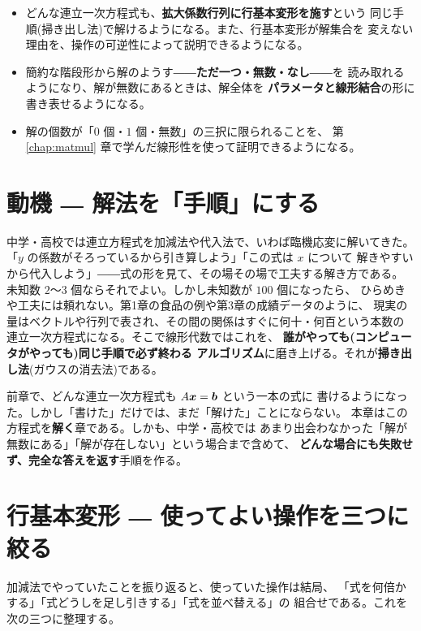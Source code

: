 \begin{goal}
\begin{itemize}
\item どんな連立一次方程式も、\textbf{拡大係数行列に行基本変形を施す}という
同じ手順(掃き出し法)で解けるようになる。また、行基本変形が解集合を
変えない理由を、操作の可逆性によって説明できるようになる。
\item 簡約な階段形から解のようす――\textbf{ただ一つ・無数・なし}――を
読み取れるようになり、解が無数にあるときは、解全体を
\textbf{パラメータと線形結合}の形に書き表せるようになる。
\item 解の個数が「$0$ 個・$1$ 個・無数」の三択に限られることを、
第 \ref{chap:matmul} 章で学んだ線形性を使って証明できるようになる。
\end{itemize}
\end{goal}

\section{動機 ― 解法を「手順」にする}

中学・高校では連立方程式を加減法や代入法で、いわば臨機応変に解いてきた。
「$y$ の係数がそろっているから引き算しよう」「この式は $x$ について
解きやすいから代入しよう」――式の形を見て、その場その場で工夫する解き方である。
未知数 $2$〜$3$ 個ならそれでよい。しかし未知数が $100$ 個になったら、
ひらめきや工夫には頼れない。第1章の食品の例や第3章の成績データのように、
現実の量はベクトルや行列で表され、その間の関係はすぐに何十・何百という本数の
連立一次方程式になる。そこで線形代数ではこれを、
\textbf{誰がやっても(コンピュータがやっても)同じ手順で必ず終わる
アルゴリズム}に磨き上げる。それが\textbf{掃き出し法}(ガウスの消去法)である。

前章で、どんな連立一次方程式も $A\bm{x} = \bm{b}$ という一本の式に
書けるようになった。しかし「書けた」だけでは、まだ「解けた」ことにならない。
本章はこの方程式を\textbf{解く}章である。しかも、中学・高校では
あまり出会わなかった「解が無数にある」「解が存在しない」という場合まで含めて、
\textbf{どんな場合にも失敗せず、完全な答えを返す}手順を作る。

\section{行基本変形 ― 使ってよい操作を三つに絞る}

加減法でやっていたことを振り返ると、使っていた操作は結局、
「式を何倍かする」「式どうしを足し引きする」「式を並べ替える」の
組合せである。これを次の三つに整理する。

